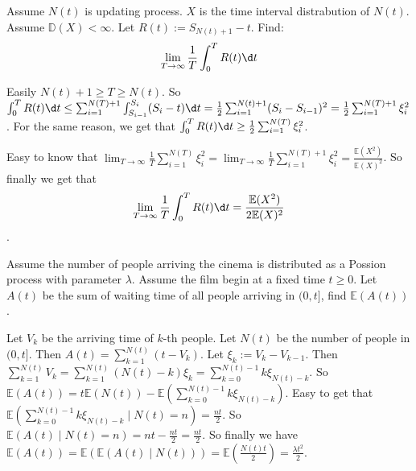 \documentclass{ctexart}
\newif\ifpreface
\begin{document}
\large
\setlength{\baselineskip}{1.2em}
\ifpreface
  
\else
\fi
{}
\begin{problem}\label{pro:1}
  Assume \(N(t)\) is updating process. \(X\) is the time interval distrabution of \(N(t)\).
  Assume \(\mathbb{D}(X)<\infty\).
  Let \(R(t):=S_{N(t)+1}-t\). Find:
  \[
    \lim_{T \to \infty} \frac{1}{T}\int_{0}^{T}R(t) \d t
  \]
\end{problem}
\begin{solution}
  Easily \(N(t)+1 \geq T \geq N(t)\).
  So \(\int_{0}^{T}R(t) \d t \leq \sum_{i=1}^{N(T)+1} \int_{S_{i-1}}^{S_i}(S_i-t) \d t=\frac{1}{2}\sum_{i=1}^{N(t)+1} (S_i-S_{i-1})^2=\frac{1}{2} \sum_{i=1}^{N(T)+1} \xi_i^2\).
  For the same reason, we get that \(\int_{0}^{T}R(t) \d t \geq \frac{1}{2} \sum_{i=1}^{N(T)} \xi_i^2\).

  Easy to know that \(\lim_{T \to \infty} \frac{1}{T} \sum_{i=1}^{N(T)} \xi_i^2=\lim_{T \to \infty} \frac{1}{T} \sum_{i=1}^{N(T)+1} \xi_i^2=\frac{\mathbb{E}(X^2)}{\mathbb{E}(X)^2}\).
  So finally we get that
  \[
    \lim_{T \to \infty} \frac{1}{T}\int_{0}^{T}R(t) \d t=\frac{\mathbb{E}(X^2)}{2\mathbb{E}(X)^2}
  \]
  .
\end{solution}
\begin{problem}\label{pro:2}
  Assume the number of people arriving the cinema is distributed as a Possion process with parameter \(\lambda\).
  Assume the film begin at a fixed time \(t \geq 0\).
  Let \(A(t)\) be the sum of waiting time of all people arriving in \((0,t]\), find \(\mathbb{E}(A(t))\).
\end{problem}
\begin{solution}
  Let \(V_k\) be the arriving time of \(k\)-th people. Let \(N(t)\) be the number of people in \((0,t]\).
  Then \(A(t)=\sum_{k=1}^{N(t)} (t-V_k)\). Let \(\xi_k:=V_k-V_{k-1}\).
  Then \(\sum_{k=1}^{N(t)} V_k=\sum_{k=1}^{N(t)} (N(t)-k)\xi_k=\sum_{k=0}^{N(t)-1} k \xi_{N(t)-k}\).
  So \(\mathbb{E}(A(t))=t \mathbb{E}(N(t))-\mathbb{E}(\sum_{k=0}^{N(t)-1} k\xi_{N(t)-k})\).
  Easy to get that \(\mathbb{E}(\sum_{k=0}^{N(t)-1} k\xi_{N(t)-k} \mid N(t)=n)=\frac{nt}{2}\).
  So \(\mathbb{E}(A(t) \mid N(t)=n)=nt-\frac{nt}{2}=\frac{nt}{2}\).
  So finally we have \(\mathbb{E}(A(t))=\mathbb{E}(\mathbb{E}(A(t) \mid N(t)))=\mathbb{E}(\frac{N(t)t}{2})=\frac{\lambda t^2}{2}\).
\end{solution}
\end{document}
